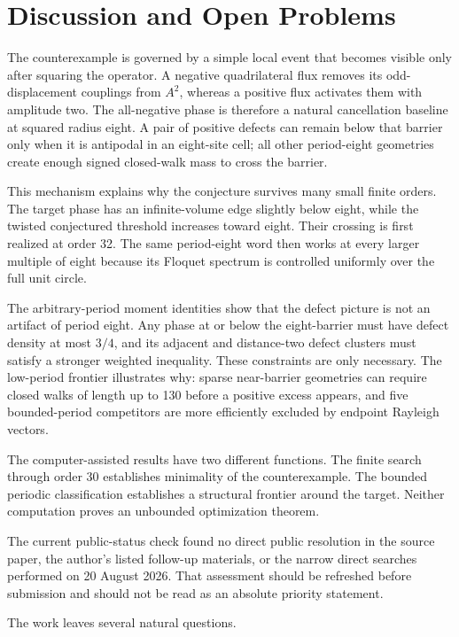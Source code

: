 \section{Discussion and Open Problems}

The counterexample is governed by a simple local event that becomes visible
only after squaring the operator. A negative quadrilateral flux removes its
odd-displacement couplings from \(A^2\), whereas a positive flux activates them
with amplitude two. The all-negative phase is therefore a natural
cancellation baseline at squared radius eight. A pair of positive defects can
remain below that barrier only when it is antipodal in an eight-site cell; all
other period-eight geometries create enough signed closed-walk mass to cross
the barrier.

This mechanism explains why the conjecture survives many small finite orders.
The target phase has an infinite-volume edge slightly below eight, while the
twisted conjectured threshold increases toward eight. Their crossing is first
realized at order 32. The same period-eight word then works at every larger
multiple of eight because its Floquet spectrum is controlled uniformly over
the full unit circle.

The arbitrary-period moment identities show that the defect picture is not an
artifact of period eight. Any phase at or below the eight-barrier must have
defect density at most \(3/4\), and its adjacent and distance-two defect clusters
must satisfy a stronger weighted inequality. These constraints are only
necessary. The low-period frontier illustrates why: sparse near-barrier
geometries can require closed walks of length up to 130 before a positive
excess appears, and five bounded-period competitors are more efficiently
excluded by endpoint Rayleigh vectors.

The computer-assisted results have two different functions. The finite search
through order 30 establishes minimality of the counterexample. The bounded
periodic classification establishes a structural frontier around the target.
Neither computation proves an unbounded optimization theorem.

The current public-status check found no direct public resolution in the
source paper, the author's listed follow-up materials, or the narrow direct
searches performed on 20 August 2026. That assessment should be refreshed
before submission and should not be read as an absolute priority statement.

The work leaves several natural questions.

